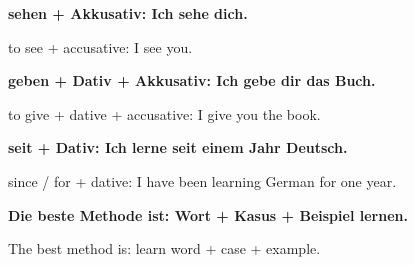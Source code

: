 \documentclass[a4paper]{article}
\newcommand{\EN}[1]{\par{\small\textcolor{TranslationGray}{#1}}\vspace{0.4em}}
\begin{document}
        \textbf{sehen + Akkusativ: Ich sehe dich.}
        \EN{to see + accusative: I see you.}
        
        \textbf{geben + Dativ + Akkusativ: Ich gebe dir das Buch.}
        \EN{to give + dative + accusative: I give you the book.}
        
        \textbf{seit + Dativ: Ich lerne seit einem Jahr Deutsch.}
        \EN{since / for + dative: I have been learning German for one year.}
        
        \textbf{Die beste Methode ist: Wort + Kasus + Beispiel lernen.}
        \EN{The best method is: learn word + case + example.}

%        
%        
\end{document}
